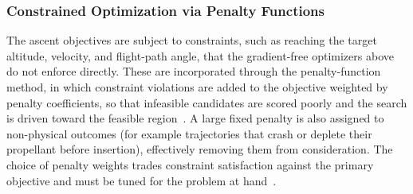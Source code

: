 \subsubsection{Constrained Optimization via Penalty Functions}

The ascent objectives are subject to constraints, such as reaching the target altitude, velocity, and flight-path angle, that the gradient-free optimizers above do not enforce directly. These are incorporated through the penalty-function method, in which constraint violations are added to the objective weighted by penalty coefficients, so that infeasible candidates are scored poorly and the search is driven toward the feasible region~\cite{nocedal2006numerical}. A large fixed penalty is also assigned to non-physical outcomes (for example trajectories that crash or deplete their propellant before insertion), effectively removing them from consideration. The choice of penalty weights trades constraint satisfaction against the primary objective and must be tuned for the problem at hand~\cite{nocedal2006numerical}.
